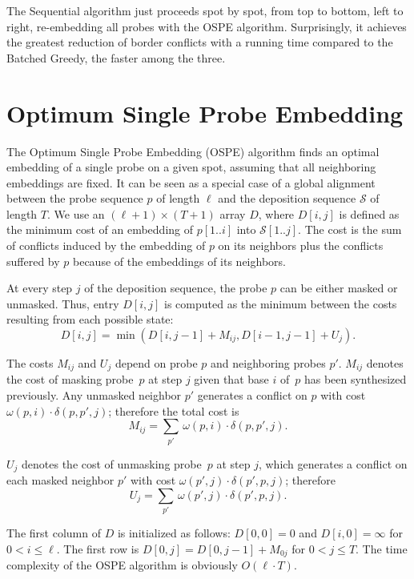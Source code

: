 \documentclass{llncs}
\begin{document}
The Sequential algorithm just proceeds spot by spot, from top to
bottom, left to right, re-embedding all probes with the OSPE algorithm.
Surprisingly, it achieves the greatest reduction of border conflicts with a
running time compared to the Batched Greedy, the faster among the three.


\section{Optimum Single Probe Embedding}
\label{sec:ospe}

The Optimum Single Probe Embedding (OSPE) algorithm finds an optimal
embedding of a single probe on a given spot, assuming that all neighboring
embeddings are fixed. It can be seen as a special case of a global alignment
between the probe sequence $p$ of length $\ell$ and the deposition sequence
$\mathcal{S}$ of length $T$. We use an $(\ell + 1) \times (T + 1)$ array
$D$, where $D[i,j]$ is defined as the minimum cost of an embedding of
$p[1..i]$ into $\mathcal{S}[1..j]$.  The cost is the sum of conflicts induced
by the embedding of $p$ on its neighbors plus the conflicts suffered by $p$
because of the embeddings of its neighbors.

At every step $j$ of the deposition sequence, the probe $p$ can be either
masked or unmasked. Thus, entry $D[i,j]$ is computed as the minimum between
the costs resulting from each possible state:
\[
D[i,j] = \min (D[i,j-1] + M_{ij}, D[i-1,j-1] + U_{j}).
\]

The costs $M_{ij}$ and $U_{j}$ depend on probe $p$ and neighboring probes $p'$.
$M_{ij}$ denotes the cost of masking probe~$p$ at step $j$ given that base $i$
of~$p$ has been synthesized previously. Any unmasked neighbor $p'$
generates a conflict on $p$ with cost $\omega(p,i)\cdot \delta(p,p',j)$;
therefore the total cost is
\[ M_{ij} = \sum_{p'}\, \omega(p,i) \cdot \delta(p,p',j). \]

$U_{j}$ denotes the cost of unmasking probe~$p$ at step $j$, which generates a
conflict on each masked neighbor $p'$ with cost $\omega(p',j)\cdot
\delta(p',p,j)$; therefore 
\[ U_j = \sum_{p'}\, \omega(p',j) \cdot \delta(p',p,j). \]

The first column of $D$ is initialized as follows: $D[0,0] = 0$ and $D[i,0] =
\infty$ for $0 < i \leq \ell$. The first row is $D[0,j] = D[0,j-1]+M_{0j}$ for
$0<j\leq T$.
The time complexity of the OSPE algorithm is obviously $O(\ell \cdot T)$.
\end{document}
